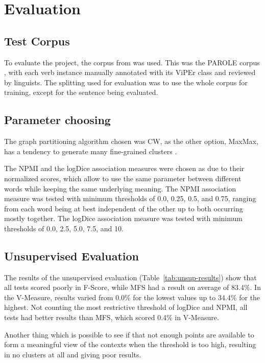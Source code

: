 \chapter{Evaluation}
\label{ch:eval}



\section{Test Corpus}

To evaluate the project, the corpus from \citep{baptista2013viper} was used. 
This was the PAROLE corpus \citep{nascimento1998parole}, with each verb 
instance manually annotated with its ViPEr class and reviewed by linguists. The 
splitting used for evaluation was to use the whole corpus for training,
except for the sentence being evaluated.

\section{Parameter choosing}

The graph partitioning algorithm chosen was \ac{CW}, as the other option,
MaxMax, has a tendency to generate many fine-grained clusters
\citep{hope2013uos}.

The \ac{NPMI} and the logDice association measures were chosen as due to their
normalized scores, which allow to use the same parameter between different words
while keeping the same underlying meaning. The \ac{NPMI} association measure 
was tested with minimum thresholds of 0.0, 0.25, 0.5, and 0.75, ranging from 
each word being at best independent of the other up to both occurring mostly 
together. The logDice association measure was tested with minimum thresholds of 
0.0, 2.5, 5.0, 7.5, and 10.

\section{Unsupervised Evaluation}

The results of the unsupervised evaluation (Table~\ref{tab:unsup-results}) show 
that all tests scored poorly in F-Score, while \ac{MFS} had a result on average 
of 83.4\%. In the V-Measure, results varied from 0.0\% for the lowest values up 
to 34.4\% for the highest. Not counting the most restrictive threshold of 
logDice and NPMI, all tests had better results than \ac{MFS}, which scored 
0.4\% in V-Measure.

Another thing which is possible to see if that not enough points are available
to form a meaningful view of the contexts when the threshold is too high,
resulting in no clusters at all and giving poor results.

